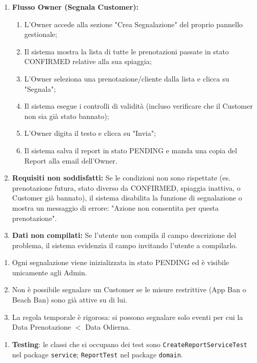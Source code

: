 \documentclass{article}
\begin{document}
	{
		\begin{enumerate}[nosep, leftmargin=25px]
			\item[\textbf{1a.}] \textbf{Flusso Owner (Segnala Customer):} 
			\begin{enumerate}[nosep, leftmargin=*]
				\item[i.] L'Owner accede alla sezione "Crea Segnalazione" del proprio pannello gestionale;
				\item[ii.] Il sistema mostra la lista di tutte le prenotazioni passate in stato CONFIRMED relative alla sua spiaggia;
				\item[iii.] L'Owner seleziona una prenotazione/cliente dalla lista e clicca su "Segnala";
				\item[iv.] Il sistema esegue i controlli di validità (incluso verificare che il Customer non sia già stato bannato);
				\item[v.] L'Owner digita il testo e clicca su "Invia";
				\item[vi.] Il sistema salva il report in stato PENDING e manda una copia del Report alla email dell'Owner.
			\end{enumerate}
			\item[\textbf{4a-e.}] \textbf{Requisiti non soddisfatti:} Se le condizioni non sono rispettate (es. prenotazione futura, stato diverso da CONFIRMED, spiaggia inattiva, o Customer già bannato), il sistema disabilita la funzione di segnalazione o mostra un messaggio di errore: "Azione non consentita per questa prenotazione".
			\item[\textbf{6a-e.}] \textbf{Dati non compilati:} Se l'utente non compila il campo descrizione del problema, il sistema evidenzia il campo invitando l'utente a compilarlo.
		\end{enumerate}
	}
	{
		\begin{enumerate}[nosep, leftmargin=*]
			\item[•] Ogni segnalazione viene inizializzata in stato PENDING ed è visibile unicamente agli Admin.
			\item[•] Non è possibile segnalare un Customer se le misure restrittive (App Ban o Beach Ban) sono già attive su di lui.
			\item[•] La regola temporale è rigorosa: si possono segnalare solo eventi per cui la Data Prenotazione $<$ Data Odierna.
		\end{enumerate}
		
		\begin{enumerate}[leftmargin=*]
			\item[•] \textbf{Testing}: le classi che si occupano dei test sono \texttt{CreateReportServiceTest} nel package \texttt{service}; \texttt{ReportTest} nel package \texttt{domain}.
		\end{enumerate}
	}
		
\end{document}
